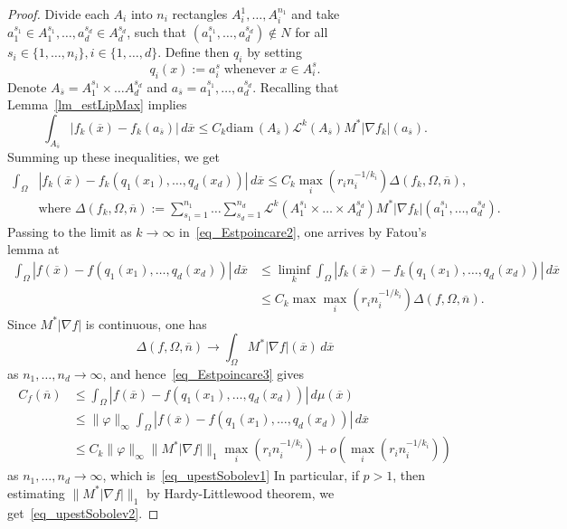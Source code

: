 \documentclass{amsart}
\theoremstyle{remark}
\numberwithin{equation}{section}
\numberwithin{figure}{section}
\def\v{\overline}
\begin{document}
\begin{proof}
Divide each $A_i$ into $n_i$ rectangles $A_i^1,\ldots, A^{n_1}_i$ and take $a_1^{s_1}\in A_1^{s_1}, \ldots, a_{d}^{s_d} \in A_d^{s_d}$, such that $(a_1^{s_1}, \ldots, a_d^{s_d})\not\in N$ for all $s_i \in \{1, \ldots, n_i\}, i\in\{1,\ldots, d\}$. 
Define then $q_i$ by setting
\[
q_i (x):= a_{i}^{s}\;\mbox{whenever }x\in A_i^s.  
\]
Denote $A_{\v s} = A_1^{s_1} \times \ldots A_d^{s_d}$ and $a_{\v s} = a_1^{s_1}, \ldots, a_d^{s_d}$. Recalling that Lemma~\ref{lm_estLipMax} implies
\begin{equation*}\label{eq_Estpoincare1}
\int_{A_{\v s}} |f_k(\v x)-f_k(a_{\v s})|\, d\v x \leq C_k\mathrm{diam}\, (A_{\v s}) \mathcal{L}^k (A_{\v s}) M^*|\nabla f_k|(a_{\v s}).
\end{equation*}
Summing up these inequalities,
we get 
\begin{equation}\label{eq_Estpoincare2}
\begin{aligned}
\int_{\Omega} & |f_k(\v x)-f_k(q_1(x_1), \ldots, q_d(x_d))|\, d\v x  \leq C_k \max_i \left(r_i n_i^{-1/k_i}\right) 
\Delta(f_k, \Omega, \v n),\\
&\mbox{where } 
\Delta(f_k, \Omega, \v n):=	\sum_{s_1=1}^{n_1}\ldots \sum_{s_d=1}^{n_d} \mathcal{L}^k (A_1^{s_1}\times\ldots\times A_d^{s_d})
 M^*|\nabla f_k|(a_1^{s_1},\ldots, a_d^{s_d}).
\end{aligned}
\end{equation}
Passing to the limit as $k\to\infty$ in~\eqref{eq_Estpoincare2}, one arrives by Fatou's lemma at
\begin{equation}\label{eq_Estpoincare3}
\begin{aligned}
\int_{\Omega} |f(\v x)-f(q_1(x_1), \ldots, q_d(x_d))|\, d\v x& \leq \liminf_k
\int_{\Omega} |f_k(\v x)-f_k(q_1(x_1), \ldots, q_d(x_d))|\, d\v x\\
& \leq C_k \max\max_i \left(r_i n_i^{-1/k_i}\right)
\Delta(f, \Omega, \v n).
\end{aligned}
\end{equation}
Since $M^*|\nabla f|$ is continuous, one has
\[
\Delta(f, \Omega, \v n)\to \int_\Omega M^*|\nabla f|(\v x)\, d\v x
\]
as $n_1, \ldots, n_d \to \infty$, and hence~\eqref{eq_Estpoincare3} gives
\begin{equation}\label{eq_Estpoincare4}
\begin{aligned}
C_f(\v n)&\leq \int_{\Omega} |f(\v x)-f(q_1(x_1), \ldots, q_d(x_d))|\, d\mu(\v x) \\
& \leq  
\|\varphi\|_\infty \int_{\Omega} |f(\v x)-f(q_1(x_1), \ldots, q_d(x_d))|\, d\v x \\
& \leq 
C_k \|\varphi\|_\infty \|M^*|\nabla f|\|_1\max_i \left(r_i n_i^{-1/k_i}\right) + o\left( \max_i \left(r_i n_i^{-1/k_i}\right) \right) 
\end{aligned}
\end{equation}
as $n_1, \ldots, n_d \to \infty$, which is~\eqref{eq_upestSobolev1}
In particular, if $p>1$, then estimating   $\|M^*|\nabla f|\|_1$ by Hardy-Littlewood theorem, we get~\eqref{eq_upestSobolev2}.
\end{proof}
\end{document}
